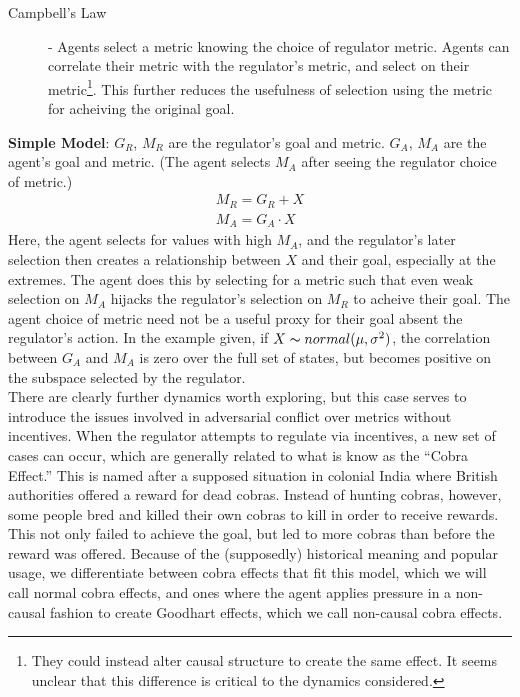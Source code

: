 \documentclass[10pt]{article}
\begin{document}
\begin{description}
\item[Campbell's Law] - Agents select a metric knowing the choice of regulator metric. Agents can correlate their metric with the regulator's metric, and select on their metric\footnote{They could instead alter causal structure to create the same effect. It seems unclear that this difference is critical to the dynamics considered.}. This further reduces the usefulness of selection using the metric for acheiving the original goal.
\end{description}
\textbf{Simple Model}:  $G_R$, $M_R$ are the regulator's goal and metric. $G_A$, $M_A$ are the agent's goal and metric. (The agent selects $M_A$ after seeing the regulator choice of metric.)
\begin{equation} \begin{split}  M_R = G_R + X \\
 M_A = G_A\cdot X
\end{split}  \end{equation}
Here, the agent selects for values with high $M_A$, and the regulator's later selection then creates a relationship between $X$ and their goal, especially at the extremes. The agent does this by selecting for a metric such that even weak selection on $M_A$ hijacks the regulator's selection on $M_R$ to acheive their goal. The agent choice of metric need not be a useful proxy for their goal absent the regulator's action. In the example given, if $X \thicksim normal(\mu, \sigma^2)$, the correlation between $G_A$ and $M_A$ is zero over the full set of states, but becomes positive on the subspace selected by the regulator.
\\

There are clearly further dynamics worth exploring, but this case serves to introduce the issues involved in adversarial conflict over metrics without incentives. When the regulator attempts to regulate via incentives, a new set of cases can occur, which are generally related to what is know as the ``Cobra Effect.'' \cite{cobra} This is named after a supposed situation in colonial India where British authorities offered a reward for dead cobras. Instead of hunting cobras, however, some people bred and killed their own cobras to kill in order to receive rewards. This not only failed to achieve the goal, but led to more cobras than before the reward was offered. Because of the (supposedly) historical meaning and popular usage, we differentiate between cobra effects that fit this model, which we will call normal cobra effects, and ones where the agent applies pressure in a non-causal fashion to create Goodhart effects, which we call non-causal cobra effects.
\end{document}
